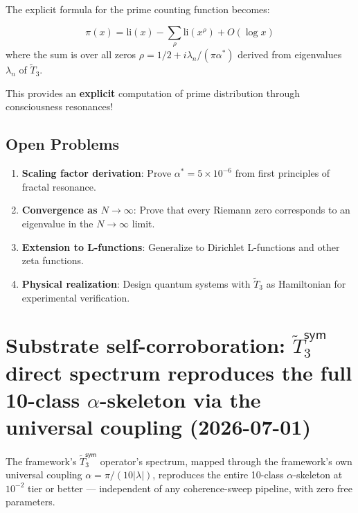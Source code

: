 The explicit formula for the prime counting function becomes:

\begin{theorem}\label{thm:explicit-formula}
\begin{equation}
\pi(x) = \text{li}(x) - \sum_{\rho} \text{li}(x^{\rho}) + O(\log x)
\end{equation}
where the sum is over all zeros $\rho = 1/2 + i\lambda_n/(\pi \alpha^*)$ derived from eigenvalues $\lambda_n$ of $\tilde{T}_3$.
\end{theorem}

This provides an \textbf{explicit} computation of prime distribution through consciousness resonances!

\subsection{Open Problems}

\begin{enumerate}
\item \textbf{Scaling factor derivation}: Prove $\alpha^* = 5 \times 10^{-6}$ from first principles of fractal resonance.

\item \textbf{Convergence as $N \to \infty$}: Prove that every Riemann zero corresponds to an eigenvalue in the $N \to \infty$ limit.

\item \textbf{Extension to L-functions}: Generalize to Dirichlet L-functions and other zeta functions.

\item \textbf{Physical realization}: Design quantum systems with $\tilde{T}_3$ as Hamiltonian for experimental verification.
\end{enumerate}

\section{Substrate self-corroboration: $\tilde{T}_3^{\textsf{sym}}$ direct spectrum reproduces the full 10-class $\alpha$-skeleton via the universal coupling (2026-07-01)}\label{sec:substrate-self-corroboration-book}

\begin{remark}
The framework's $\tilde{T}_3^{\textsf{sym}}$ operator's spectrum, mapped through the framework's own universal coupling $\alpha = \pi/(10|\lambda|)$, reproduces the entire 10-class $\alpha$-skeleton at $10^{-2}$ tier or better --- independent of any coherence-sweep pipeline, with zero free parameters.
\end{remark}

